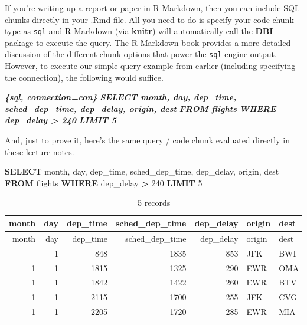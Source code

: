 \documentclass[
]{article}
\newenvironment{Shaded}{\begin{snugshade}}{\end{snugshade}}
\newcommand{\DataTypeTok}[1]{\textcolor[rgb]{0.13,0.29,0.53}{#1}}
\newcommand{\DecValTok}[1]{\textcolor[rgb]{0.00,0.00,0.81}{#1}}
\newcommand{\InformationTok}[1]{\textcolor[rgb]{0.56,0.35,0.01}{\textbf{\textit{#1}}}}
\newcommand{\KeywordTok}[1]{\textcolor[rgb]{0.13,0.29,0.53}{\textbf{#1}}}
\newcommand{\NormalTok}[1]{#1}
\newcommand{\OperatorTok}[1]{\textcolor[rgb]{0.81,0.36,0.00}{\textbf{#1}}}
\begin{document}
If you're writing up a report or paper in R Markdown, then you can
include SQL chunks directly in your .Rmd file. All you need to do is
specify your code chunk type as \texttt{sql} and R Markdown (via
\textbf{knitr}) will automatically call the \textbf{DBI} package to
execute the query. The
\href{https://bookdown.org/yihui/rmarkdown/language-engines.html\#sql}{R
Markdown book} provides a more detailed discussion of the different
chunk options that power the \texttt{sql} engine output. However, to
execute our simple query example from earlier (including specifying the
connection), the following would suffice.

\begin{Shaded}
\begin{Highlighting}[]
\InformationTok{\textasciigrave{}\textasciigrave{}\textasciigrave{}\{sql, connection=con\}}
\InformationTok{SELECT month, day, dep\_time, sched\_dep\_time, dep\_delay, origin, dest}
\InformationTok{FROM flights}
\InformationTok{WHERE dep\_delay \textgreater{} 240}
\InformationTok{LIMIT 5}
\InformationTok{\textasciigrave{}\textasciigrave{}\textasciigrave{}}
\end{Highlighting}
\end{Shaded}

And, just to prove it, here's the same query / code chunk evaluated
directly in these lecture notes.

\begin{Shaded}
\begin{Highlighting}[]
\KeywordTok{SELECT} \DataTypeTok{month}\NormalTok{, }\DataTypeTok{day}\NormalTok{, dep\_time, sched\_dep\_time, dep\_delay, origin, dest}
\KeywordTok{FROM}\NormalTok{ flights}
\KeywordTok{WHERE}\NormalTok{ dep\_delay }\OperatorTok{\textgreater{}} \DecValTok{240}
\KeywordTok{LIMIT} \DecValTok{5}
\end{Highlighting}
\end{Shaded}

\begin{longtable}[]{@{}rrrrrll@{}}
\caption{5 records}\tabularnewline
\toprule\noalign{}
month & day & dep\_time & sched\_dep\_time & dep\_delay & origin &
dest \\
\midrule\noalign{}
\endfirsthead
\toprule\noalign{}
month & day & dep\_time & sched\_dep\_time & dep\_delay & origin &
dest \\
\midrule\noalign{}
\endhead
\bottomrule\noalign{}
\endlastfoot
1 & 1 & 848 & 1835 & 853 & JFK & BWI \\
1 & 1 & 1815 & 1325 & 290 & EWR & OMA \\
1 & 1 & 1842 & 1422 & 260 & EWR & BTV \\
1 & 1 & 2115 & 1700 & 255 & JFK & CVG \\
1 & 1 & 2205 & 1720 & 285 & EWR & MIA \\
\end{longtable}
\end{document}

